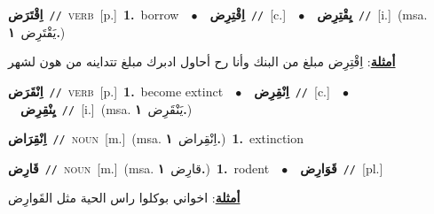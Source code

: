 \documentclass[10pt,a4paper,twoside]{article} %
\begin{document}
\begin{multicols}{2}
{\setlength\topsep{0pt}\textbf{\foreignlanguage{arabic}{اِقْتَرَض}}\ {\color{gray}\texttt{//}\color{black}}\ \textsc{verb}\ [p.]\ \textbf{1.}~borrow\ \ $\bullet$\ \ \setlength\topsep{0pt}\textbf{\foreignlanguage{arabic}{اِقْتِرِض}}\ {\color{gray}\texttt{//}\color{black}}\ [c.]\ \ $\bullet$\ \ \setlength\topsep{0pt}\textbf{\foreignlanguage{arabic}{يِقْتِرِض}}\ {\color{gray}\texttt{//}\color{black}}\ [i.]\ \color{gray}(msa. \foreignlanguage{arabic}{يَقْتَرِض}~\foreignlanguage{arabic}{\textbf{١.}})\color{black}\  \begin{flushright}\color{gray}\foreignlanguage{arabic}{\textbf{\underline{\foreignlanguage{arabic}{أمثلة}}}: اِقْتِرِض مبلغ من البنك وأنا رح أحاول ادبرك مبلغ تتداينه من هون لشهر}\end{flushright}\color{black}} \vspace{2mm}

{\setlength\topsep{0pt}\textbf{\foreignlanguage{arabic}{اِنْقَرَض}}\ {\color{gray}\texttt{//}\color{black}}\ \textsc{verb}\ [p.]\ \textbf{1.}~become extinct\ \ $\bullet$\ \ \setlength\topsep{0pt}\textbf{\foreignlanguage{arabic}{اِنْقِرِض}}\ {\color{gray}\texttt{//}\color{black}}\ [c.]\ \ $\bullet$\ \ \setlength\topsep{0pt}\textbf{\foreignlanguage{arabic}{يِنْقِرِض}}\ {\color{gray}\texttt{//}\color{black}}\ [i.]\ \color{gray}(msa. \foreignlanguage{arabic}{يَنْقَرِض}~\foreignlanguage{arabic}{\textbf{١.}})\color{black}\ } \vspace{2mm}

{\setlength\topsep{0pt}\textbf{\foreignlanguage{arabic}{اِنْقِرَاض}}\ {\color{gray}\texttt{//}\color{black}}\ \textsc{noun}\ [m.]\ \color{gray}(msa. \foreignlanguage{arabic}{اِنْقِراض}~\foreignlanguage{arabic}{\textbf{١.}})\color{black}\ \textbf{1.}~extinction\ } \vspace{2mm}

{\setlength\topsep{0pt}\textbf{\foreignlanguage{arabic}{قَارِض}}\ {\color{gray}\texttt{//}\color{black}}\ \textsc{noun}\ [m.]\ \color{gray}(msa. \foreignlanguage{arabic}{قارِض}~\foreignlanguage{arabic}{\textbf{١.}})\color{black}\ \textbf{1.}~rodent\ \ $\bullet$\ \ \setlength\topsep{0pt}\textbf{\foreignlanguage{arabic}{قَوَارِض}}\ {\color{gray}\texttt{//}\color{black}}\ [pl.]\  \begin{flushright}\color{gray}\foreignlanguage{arabic}{\textbf{\underline{\foreignlanguage{arabic}{أمثلة}}}: اخواني بوكلوا راس الحية مثل القَوارِض}\end{flushright}\color{black}} \vspace{2mm}


\end{multicols}
\end{document}

